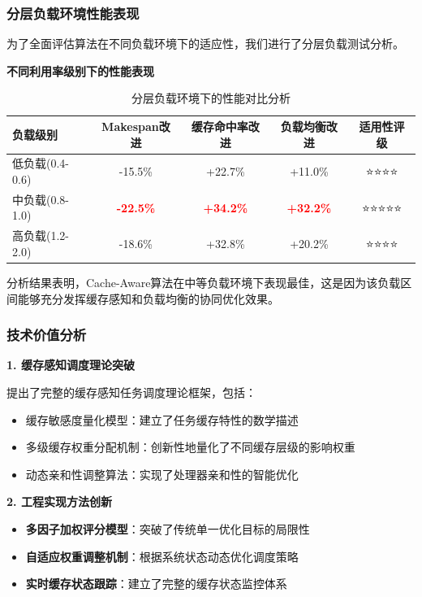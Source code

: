 \subsubsection{分层负载环境性能表现}

为了全面评估算法在不同负载环境下的适应性，我们进行了分层负载测试分析。

\textbf{不同利用率级别下的性能表现}

\begin{table}[htbp]
\centering
\caption{分层负载环境下的性能对比分析}
\label{tab:workload_performance}
\begin{tabular}{|l|c|c|c|c|}
\hline
\textbf{负载级别} & \textbf{Makespan改进} & \textbf{缓存命中率改进} & \textbf{负载均衡改进} & \textbf{适用性评级} \\
\hline
低负载(0.4-0.6) & -15.5\% & +22.7\% & +11.0\% & ⭐⭐⭐⭐ \\
\hline
中负载(0.8-1.0) & \textcolor{red}{\textbf{-22.5\%}} & \textcolor{red}{\textbf{+34.2\%}} & \textcolor{red}{\textbf{+32.2\%}} & ⭐⭐⭐⭐⭐ \\
\hline
高负载(1.2-2.0) & -18.6\% & +32.8\% & +20.2\% & ⭐⭐⭐⭐ \\
\hline
\end{tabular}
\end{table}

分析结果表明，Cache-Aware算法在中等负载环境下表现最佳，这是因为该负载区间能够充分发挥缓存感知和负载均衡的协同优化效果。

\subsubsection{技术价值分析}

\textbf{1. 缓存感知调度理论突破}

提出了完整的缓存感知任务调度理论框架，包括：
\begin{itemize}
    \item 缓存敏感度量化模型：建立了任务缓存特性的数学描述
    \item 多级缓存权重分配机制：创新性地量化了不同缓存层级的影响权重
    \item 动态亲和性调整算法：实现了处理器亲和性的智能优化
\end{itemize}

\textbf{2. 工程实现方法创新}

\begin{itemize}
    \item \textbf{多因子加权评分模型}：突破了传统单一优化目标的局限性
    \item \textbf{自适应权重调整机制}：根据系统状态动态优化调度策略
    \item \textbf{实时缓存状态跟踪}：建立了完整的缓存状态监控体系
\end{itemize}

